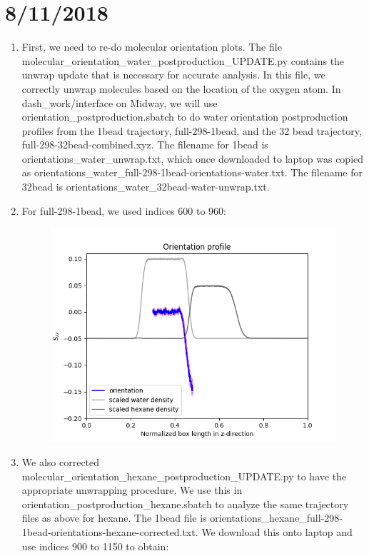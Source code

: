 \documentclass[12pt,reqno]{amsart}
\numberwithin{equation}{section}
\begin{document}
\section{8/11/2018}
\begin{enumerate}
\item First, we need to re-do molecular orientation plots.  The file molecular\_orientation\_water\_postproduction\_UPDATE.py contains the unwrap update that is necessary for accurate analysis.  In this file, we correctly unwrap molecules based on the location of the oxygen atom.  In dash\_work/interface on Midway, we will use orientation\_postproduction.sbatch to do water orientation postproduction profiles from the 1bead trajectory, full-298-1bead, and the 32 bead trajectory, full-298-32bead-combined.xyz.  The filename for 1bead is orientations\_water\_unwrap.txt, which once downloaded to laptop was copied as orientations\_water\_full-298-1bead-orientations-water.txt.  The filename for 32bead is orientations\_water\_32bead-water-unwrap.txt.    
\item For full-298-1bead, we used indices 600 to 960:
\begin{figure}[H]
\centering
\includegraphics[scale=0.7]{full-298-1bead-orientations-water-corrected}
\end{figure}
\item We also corrected molecular\_orientation\_hexane\_postproduction\_UPDATE.py to have the appropriate unwrapping procedure.  We use this in orientation\_postproduction\_hexane.sbatch to analyze the same trajectory files as above for hexane.  The 1bead file is orientations\_hexane\_full-298-1bead-orientations-hexane-corrected.txt.  We download this onto laptop and use indices 900 to 1150 to obtain:

\end{enumerate}
\end{document}
